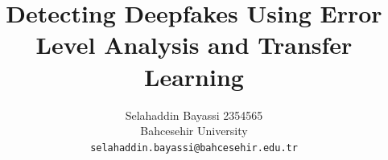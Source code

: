 \documentclass[10pt,twocolumn,letterpaper]{article}
\title{Detecting Deepfakes Using Error Level Analysis and Transfer Learning}
\author{Selahaddin Bayassi 2354565\\
Bahcesehir University\\
{\tt\small selahaddin.bayassi@bahcesehir.edu.tr}
}
\begin{document}
\maketitle
    






{
    \small
    
    
}
\end{document}
